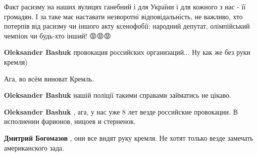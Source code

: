 \begin{itemize}
Факт расизму на наших вулицях ганебний і для України і для кожного з нас - її
громадян. І за таке має наставати незворотні відповідальність, не важливо, хто
потерпів від расизму чи іншого акту ксенофобії: народний депутат, олімпійський
чемпіон чи будь-хто інший! 😡😡😡

\begin{itemize}
 
\textbf{Oleksander Bashuk} провокация российских организаций... Ну как же без руки кремля)

 
Ага, во всём виноват Кремль.

 
\textbf{Oleksander Bashuk} нашій поліції такими справами займатись не цікаво.

 
\textbf{Oleksander Bashuk} , ага, у нас уже 8 лет везде российские провокации. В исполнении фарионов, ницоев и стерненок.

 
\textbf{Дмитрий Богомазов} , они все видят руку кремля.
Не хотят только везде замечать американского зада.
\end{itemize}

 


\end{itemize}
